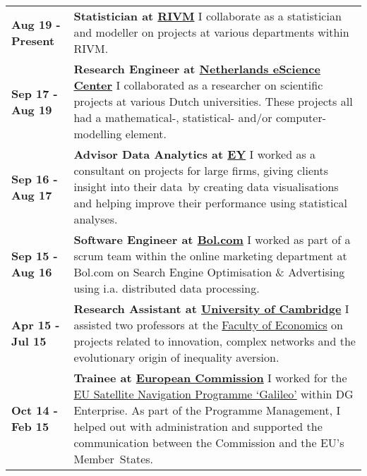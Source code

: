\documentclass[a4paper,9pt]{extarticle}
\begin{document}
\begin{center}
\setlength{\tabcolsep}{0mm}
\begin{tabular}{p{}p{}}
\textbf{Aug 19 - Present}&\textbf{Statistician at \href{https://www.rivm.nl/}{RIVM}}\newline
I collaborate as a statistician and modeller on projects at various departments within RIVM.
\vspace{0mm}\\
\textbf{Sep 17 - Aug 19}&\textbf{Research Engineer at \href{https://www.esciencecenter.nl}{Netherlands eScience Center}}\newline
I collaborated as a researcher on scientific projects at various Dutch universities. These projects all had a mathematical-, statistical- and/or computer-modelling element.
\vspace{2mm}\\
\textbf{Sep 16 - Aug 17}&\textbf{Advisor Data Analytics at \href{http://www.ey.com/nl/nl}{ EY}}\newline
I worked as a consultant on projects for large firms, giving clients insight into their data~by creating data visualisations and helping improve their performance using statistical analyses.\vspace{2mm}\\
\textbf{Sep 15 - Aug 16}&\textbf{Software Engineer at \href{https://www.bol.com}{Bol.com}}\newline
I worked as part of a scrum team within the online marketing department at Bol.com on Search Engine Optimisation \& Advertising using i.a. distributed data processing.\vspace{2mm}\\
\textbf{Apr 15 - Jul 15}&\textbf{Research Assistant at \href{https://www.cam.ac.uk}{University of Cambridge}}\newline
I assisted two professors at the \href{http://www.econ.cam.ac.uk}{Faculty of Economics} on projects related to innovation, complex networks and the evolutionary origin of inequality aversion.
\vspace{2mm}\\
\textbf{Oct 14 - Feb 15}&\textbf{Trainee at \href{https://ec.europa.eu/stages/}{European Commission}}\newline
I worked for the \href{https://www.gsa.europa.eu}{EU Satellite Navigation Programme `Galileo'} within DG Enterprise. As part of the Programme Management, I helped out with administration and supported the communication between the Commission and the EU's Member~States.
\end{tabular}
\end{center}
\end{document}
